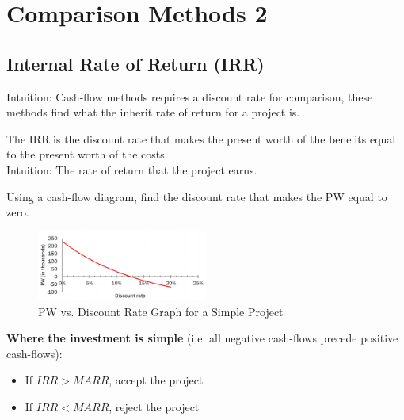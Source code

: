 \chapter{Comparison Methods 2}

\section{Internal Rate of Return (IRR)}

\begin{remark}
    Intuition: Cash-flow methods requires a discount rate for comparison, these methods find what the inherit rate of return for a project is.
\end{remark}

\begin{definition}
    The IRR is the discount rate that makes the present worth of the benefits equal to the present worth of the costs.\\
    Intuition: The rate of return that the project earns.
\end{definition}

\begin{theorem}
    Using a cash-flow diagram, find the discount rate that makes the PW equal to zero.
\end{theorem}

\begin{figure}[H]
    \centering
    \includegraphics[width=0.5\textwidth]{LECTURE_6/IRR.png}
    \caption{PW vs. Discount Rate Graph for a Simple Project}
\end{figure}

\begin{proposition}

    \textbf{Where the investment is simple} (i.e. all negative cash-flows precede positive cash-flows):
    \begin{itemize}
        \item If $IRR > MARR$, accept the project
        \item If $IRR < MARR$, reject the project
    \end{itemize}
\end{proposition}

